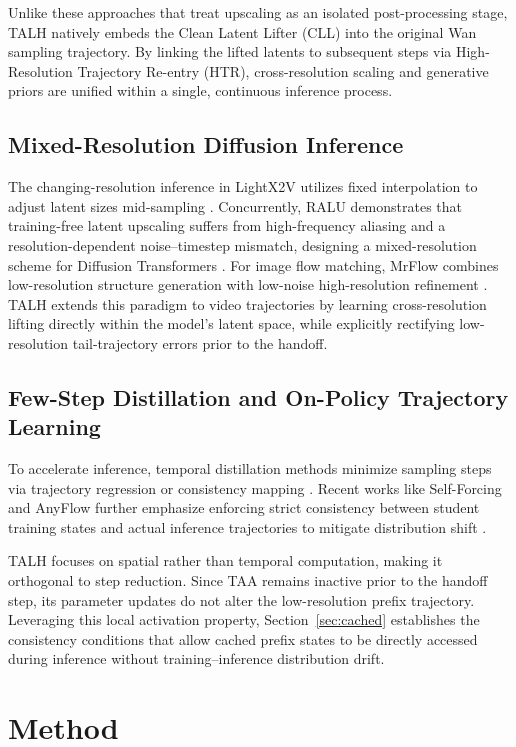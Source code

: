 Unlike these approaches that treat upscaling as an isolated post-processing stage, TALH natively embeds the Clean Latent Lifter (CLL) into the original Wan sampling trajectory. By linking the lifted latents to subsequent steps via High-Resolution Trajectory Re-entry (HTR), cross-resolution scaling and generative priors are unified within a single, continuous inference process.

\subsection{Mixed-Resolution Diffusion Inference}
The changing-resolution inference in LightX2V utilizes fixed interpolation to adjust latent sizes mid-sampling \citep{lightx2v2026}. Concurrently, RALU demonstrates that training-free latent upscaling suffers from high-frequency aliasing and a resolution-dependent noise--timestep mismatch, designing a mixed-resolution scheme for Diffusion Transformers \citep{jeong2025ralu}. For image flow matching, MrFlow combines low-resolution structure generation with low-noise high-resolution refinement \citep{zheng2026mrflow}. TALH extends this paradigm to video trajectories by learning cross-resolution lifting directly within the model's latent space, while explicitly rectifying low-resolution tail-trajectory errors prior to the handoff.

\subsection{Few-Step Distillation and On-Policy Trajectory Learning}
To accelerate inference, temporal distillation methods minimize sampling steps via trajectory regression or consistency mapping \citep{luo2023lcm, yin2024dmd2, zhai2024mcm}. Recent works like Self-Forcing and AnyFlow further emphasize enforcing strict consistency between student training states and actual inference trajectories to mitigate distribution shift \citep{huang2025selfforcing, gu2026anyflow}.

TALH focuses on spatial rather than temporal computation, making it orthogonal to step reduction. Since TAA remains inactive prior to the handoff step, its parameter updates do not alter the low-resolution prefix trajectory. Leveraging this local activation property, Section~\ref{sec:cached} establishes the consistency conditions that allow cached prefix states to be directly accessed during inference without training--inference distribution drift.

\section{Method}

